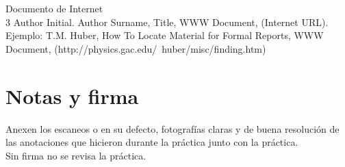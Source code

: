 \documentclass[letterpaper, 11pt]{article}
\begin{document}
Documento de Internet\\
3 Author Initial. Author Surname, Title, WWW Document, (Internet URL).\\
Ejemplo: T.M. Huber, How To Locate Material for Formal Reports, WWW Document, (http://physics.gac.edu/~huber/misc/finding.htm)



\appendix
\clearpage
\addappheadtotoc
\appendixpage

\section{Notas y firma}
Anexen los escaneos o en su defecto, fotografías claras y de buena resolución de las anotaciones que hicieron durante la práctica junto con la práctica.\\
Sin firma no se revisa la práctica.
\end{document}
